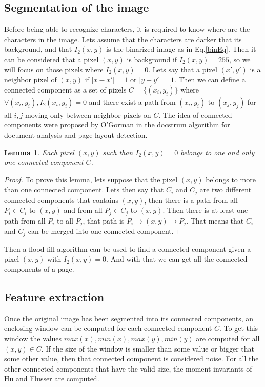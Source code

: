 \documentclass[10pt,journal]{IEEEtran}
\begin{document}
	\subsection{Segmentation of the image}
	Before being able to recognize characters, it is required to know where are the characters in the
	image. Lets assume that the characters are darker that its background, and that $I_2(x,y)$ is the
	binarized image as in Eq.\eqref{binEq}. Then it can be considered that a pixel $(x,y)$ is background
	if $I_2(x,y)=255$, so we will focus on those pixels where $I_2(x,y)=0$.\newline
	Lets say that a pixel $(x',y')$ is a neighbor pixel of $(x,y)$ if $|x-x'|=1$ or $|y-y'|=1$. Then we
	can define a connected component as a set of pixels $C=\{(x_i,y_i)\}$ where $\forall{(x_i,y_i)}, I_2(x_i,y_i)=0$
	and there exist a path from $(x_i,y_i)$ to $(x_j,y_j)$ for all $i,j$ moving only between neighbor
	pixels on $C$. The idea of connected components were proposed by O'Gorman \cite{docstrum93} in the
	docstrum algorithm for document analysis and page layout detection.
	
	\newtheorem{pixHasOneC}{Lemma}
	\begin{pixHasOneC}
		Each pixel $(x,y)$ such than $I_2(x,y)=0$ belongs to one and only one connected component $C$.
	\end{pixHasOneC}
	\begin{proof}
		To prove this lemma, lets suppose that the pixel $(x,y)$ belongs to more than one connected
		component. Lets then say that $C_i$ and $C_j$ are two different connected components that
		contains $(x,y)$, then there is a path from all $P_i \in C_i$ to $(x,y)$ and from all
		$P_j \in C_j$ to $(x,y)$.
		Then there is at least one path from all $P_i$ to all $P_j$, that path is 
		$P_i \rightarrow (x,y) \rightarrow P_j$. That means that $C_i$ and $C_j$ can be merged
		into one connected component.
	\end{proof}
	
	Then a flood-fill algorithm can be used to find a connected component given a pixel $(x,y)$ with $I_2(x,y)=0$. And
	with that we can get all the connected components of a page.
	
	
	\subsection{Feature extraction}
	Once the original image has been segmented into its connected components, an enclosing window can be
	computed for each connected component $C$. To get this window the values $max(x),min(x),max(y),min(y)$
	are computed for all $(x,y) \in C$.
	If the size of the window is smaller than some value or bigger that some other value, then that
	connected component is considered noise. For all the other connected components that have the
	valid size, the moment invariants of Hu and Flusser are computed.
	
\end{document}
